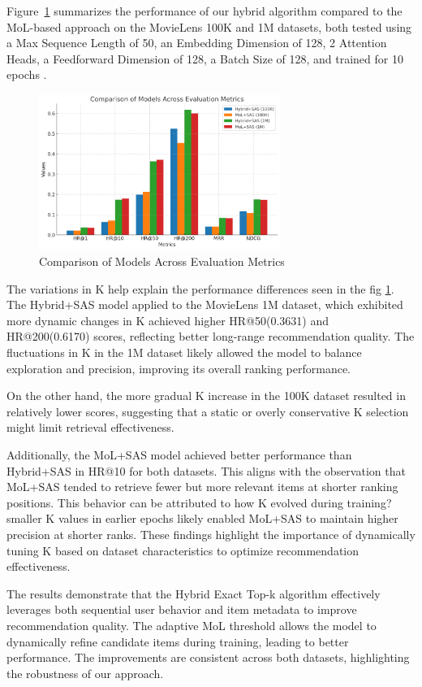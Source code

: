 Figure~\ref{histo_p} summarizes the performance of our hybrid algorithm compared to the MoL-based approach on the MovieLens 100K and 1M datasets, both tested using a Max Sequence Length of 50, an Embedding Dimension of 128, 2 Attention Heads, a Feedforward Dimension of 128, a Batch Size of 128, and trained for 10 epochs . \\
\begin{figure}[ht]
	\centering
	\includegraphics[width=0.7\textwidth]{Figures/HISTOGRAM.png}
	\caption{Comparison of Models Across Evaluation Metrics}\label{histo_p}
\end{figure}
The variations in K help explain the performance differences seen in the fig \ref{histo_p}. The Hybrid+SAS model applied to the MovieLens 1M dataset, which exhibited more dynamic changes in K achieved higher HR@50(0.3631) and HR@200(0.6170) scores, reflecting better long-range recommendation quality. The fluctuations in K in the 1M dataset likely allowed the model to balance exploration and precision, improving its overall ranking performance.

On the other hand, the more gradual K increase in the 100K dataset resulted in relatively lower scores, suggesting that a static or overly conservative 
K selection might limit retrieval effectiveness.

Additionally, the MoL+SAS model achieved better performance than Hybrid+SAS in HR@10 for both datasets. This aligns with the observation that MoL+SAS tended to retrieve fewer but more relevant items at shorter ranking positions. This behavior can be attributed to how K evolved during training?smaller K values in earlier epochs likely enabled MoL+SAS to maintain higher precision at shorter ranks.
These findings highlight the importance of dynamically tuning K based on dataset characteristics to optimize recommendation effectiveness.


The results demonstrate that the Hybrid Exact Top-k algorithm effectively leverages both sequential user behavior and item metadata to improve recommendation quality. The adaptive MoL threshold allows the model to dynamically refine candidate items during training, leading to better performance. The improvements are consistent across both datasets, highlighting the robustness of our approach.\\ 
